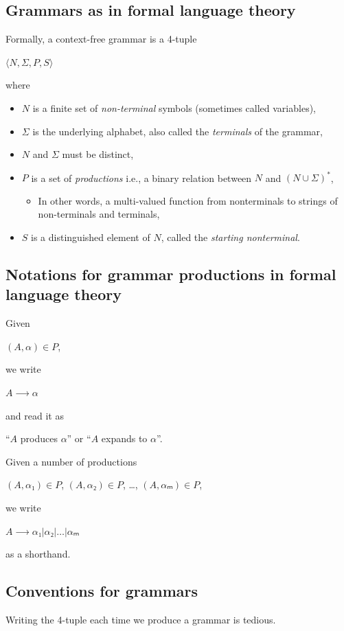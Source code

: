 \documentclass[11pt]{article}
\theoremstyle{definition}
\begin{document}
\subsection{Grammars as in formal language theory}
\label{sec:org118d6ea}
Formally, a context-free grammar is a 4-tuple
\begin{center}
\(⟨N, Σ, P, S⟩\)
\end{center}
where
\begin{itemize}
\item \(N\) is a finite set of \emph{non-terminal} symbols
(sometimes called variables),
\item \(Σ\) is the underlying alphabet,
also called the \emph{terminals} of the grammar,
\item \(N\) and \(Σ\) must be distinct,
\item \(P\) is a set of \emph{productions} i.e.,
a binary relation between \(N\) and \((N ∪ Σ)^{*}\),
\begin{itemize}
\item In other words, a multi-valued function from
nonterminals to strings of non-terminals and terminals,
\end{itemize}
\item \(S\) is a distinguished element of \(N\), called the \emph{starting nonterminal}.
\end{itemize}

\subsection{Notations for grammar productions in formal language theory}
\label{sec:orgf396016}
Given
\begin{center}
\((A, α) ∈ P\),
\end{center}
we write
\begin{center}
\(A ⟶ α\)
\end{center}
and read it as
\begin{center}
“\(A\) produces \(α\)” or “\(A\) expands to \(α\)”.
\end{center}

Given a number of
productions
\begin{center}
\((A, α₁) ∈ P\), \((A, α₂) ∈ P\), …, \((A, αₘ) ∈ P\),
\end{center}
we write
\begin{center}
\(A ⟶ α₁ | α₂ | … | αₘ\)
\end{center}
as a shorthand.

\subsection{Conventions for grammars}
\label{sec:orged8f2ad}
Writing the 4-tuple each time we produce a grammar is tedious.
\end{document}
